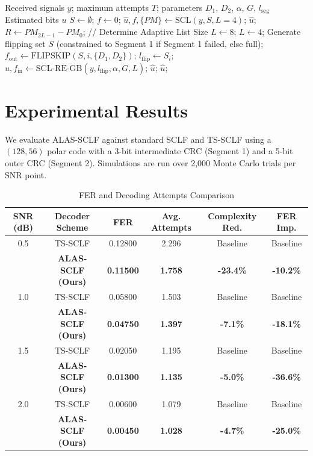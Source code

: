 \documentclass[journal,twocolumn]{IEEEtran}
\begin{document}
\begin{algorithm}
\caption{Proposed ALAS-SCLF Decoder}
\begin{algorithmic}[1]
\INPUT Received signals $y$; maximum attempts $T$; parameters $D_1$, $D_2$, $\alpha$, $G$, $l_{\text{seg}}$
\OUTPUT Estimated bits $u$
\STATE $S \leftarrow \emptyset$; $f \leftarrow 0$;
\STATE $\hat{u}, f, \{PM\} \leftarrow \text{SCL}(y, S, L=4)$;
\RETURN $\hat{u}$;
\ENDIF
\STATE $R \leftarrow PM_{2L-1} - PM_0$;
\STATE // Determine Adaptive List Size
\STATE $L \leftarrow 8$;
\ELSE
\STATE $L \leftarrow 4$;
\ENDIF
\STATE Generate flipping set $S$ (constrained to Segment 1 if Segment 1 failed, else full);
\STATE $f_{\text{out}} \leftarrow \text{FLIPSKIP}(S, i, \{D_1, D_2\})$;
\STATE $l_{\text{flip}} \leftarrow S_i$;
\STATE $\hat{u}, f_{\text{in}} \leftarrow \text{SCL-RE-GB}(y, l_{\text{flip}}, \alpha, G, L)$;
\RETURN $\hat{u}$;
\ENDIF
\ENDIF
\ENDFOR
\RETURN $\hat{u}$;
\end{algorithmic}
\end{algorithm}

\section{Experimental Results}
We evaluate ALAS-SCLF against standard SCLF and TS-SCLF using a $(128, 56)$ polar code with a 3-bit intermediate CRC (Segment 1) and a 5-bit outer CRC (Segment 2). Simulations are run over 2,000 Monte Carlo trials per SNR point.

\begin{table}[htbp]
\caption{FER and Decoding Attempts Comparison}
\centering
\begin{tabular}{cccccc}
\toprule
\textbf{SNR (dB)} & \textbf{Decoder Scheme} & \textbf{FER} & \textbf{Avg. Attempts} & \textbf{Complexity Red.} & \textbf{FER Imp.} \\
\midrule
0.5 & TS-SCLF & 0.12800 & 2.296 & Baseline & Baseline \\
    & \textbf{ALAS-SCLF (Ours)} & \textbf{0.11500} & \textbf{1.758} & \textbf{-23.4\%} & \textbf{-10.2\%} \\
\midrule
1.0 & TS-SCLF & 0.05800 & 1.503 & Baseline & Baseline \\
    & \textbf{ALAS-SCLF (Ours)} & \textbf{0.04750} & \textbf{1.397} & \textbf{-7.1\%} & \textbf{-18.1\%} \\
\midrule
1.5 & TS-SCLF & 0.02050 & 1.195 & Baseline & Baseline \\
    & \textbf{ALAS-SCLF (Ours)} & \textbf{0.01300} & \textbf{1.135} & \textbf{-5.0\%} & \textbf{-36.6\%} \\
\midrule
2.0 & TS-SCLF & 0.00600 & 1.079 & Baseline & Baseline \\
    & \textbf{ALAS-SCLF (Ours)} & \textbf{0.00450} & \textbf{1.028} & \textbf{-4.7\%} & \textbf{-25.0\%} \\
\bottomrule
\end{tabular}
\label{tab:comparison}
\end{table}
\end{document}
